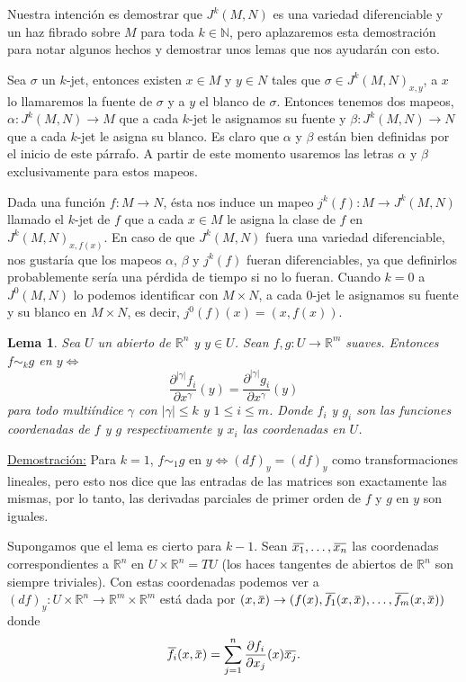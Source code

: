 \documentclass{report}
\newtheorem{lem}[theorem]{Lema}
\theoremstyle{definition}
\newcommand{\overbar}[1]{\mkern 1.5mu\overline{\mkern-1.5mu#1\mkern-1.5mu}\mkern 1.5mu}
\begin{document}
Nuestra intenci\'on es demostrar que $J^k (M,N)$ es una variedad diferenciable y un haz fibrado sobre $M$ para toda $k \in \mathbb{N}$, pero aplazaremos esta demostraci\'on para notar algunos hechos y demostrar unos lemas que nos ayudar\'an con esto. 


Sea $\sigma$ un $k$-jet, entonces existen $x \in M$ y $y \in N$ tales que $\sigma \in J^k (M,N)_{x,y}$, a $x$ lo llamaremos la fuente de $\sigma$ y a $y$ el blanco de $\sigma$. Entonces tenemos dos mapeos, $\alpha: J^k (M,N) \to M$ que a cada $k$-jet le asignamos su fuente y $\beta:J^k (M,N) \to N$ que a cada $k$-jet le asigna su blanco. Es claro que $\alpha$ y $\beta$ est\'an bien definidas por el inicio de este p\'arrafo. A partir de este momento usaremos las letras $\alpha$ y $\beta$ exclusivamente para estos mapeos.

Dada una funci\'on $f:M \to N$, \'esta nos induce un mapeo $j^k (f) : M \to J^k(M,N)$ llamado el $k$-jet de $f$ que a cada $x \in M$ le asigna la clase de $f$ en $J^k (M , N )_{x , f(x)}$. En caso de que $J^k (M,N)$ fuera una variedad diferenciable, nos gustar\'ia que los mapeos $\alpha$, $\beta$ y $j^k (f)$ fueran diferenciables, ya que definirlos probablemente ser\'ia una p\'erdida de tiempo si no lo fueran. Cuando $k=0$ a $J^0 (M,N)$ lo podemos identificar con $M \times N$, a cada $0$-jet le asignamos su fuente y su blanco en $M \times N$, es decir, $j^0 (f) (x) = (x, f(x))$.


\begin{lem}
Sea $U$ un abierto de $\mathbb{R}^n$ y $y \in U$. Sean $f,g : U \to \mathbb{R}^m$ suaves. Entonces $f \sim_k g$ en $y \iff$ $$ \frac{\partial^{\vert \gamma \vert} f_i }{\partial x^\gamma} (y) = \frac{\partial^{\vert \gamma \vert} g_i }{\partial x^\gamma} (y)$$
para todo multi\'indice $\gamma$ con $\vert \gamma \vert \leq  k$ y $1 \leq i \leq m$. Donde $f_i$ y $g_i$ son las funciones coordenadas de $f$ y $g$ respectivamente y $x_i$ las coordenadas en $U$.
\end{lem}

\underline{Demostraci\'on:} Para $k=1$, $f \sim_1 g$ en $y \iff (df)_y = (df)_y$ como transformaciones lineales, pero esto nos dice que las entradas de las matrices son exactamente las mismas, por lo tanto, las derivadas parciales de primer orden de $f$ y $g$ en $y$ son iguales.

Supongamos que el lema es cierto para $k-1$. Sean $\overbar{x_1}, \dots , \overbar{x_n}$ las coordenadas correspondientes a $\mathbb{R}^n$ en $U \times \mathbb{R}^n = TU$ (los haces tangentes de abiertos de $\mathbb{R}^n$ son siempre triviales). Con estas coordenadas podemos ver a $(df)_y: U \times \mathbb{R}^n \to \mathbb{R}^m \times \mathbb{R}^m$ est\'a dada por $(x, \overbar{x}) \to (f(x) , \overbar{f_1} (x , \overbar{x}) , \dots , \overbar{f_m} (x ,\overbar{x} ))$ donde $$ \overbar{f_i} ( x , \overbar{x}) = \sum\limits_{j=1}^n \frac{\partial f_i}{\partial x_j} (x) \overbar{x_j} .$$
\end{document}

